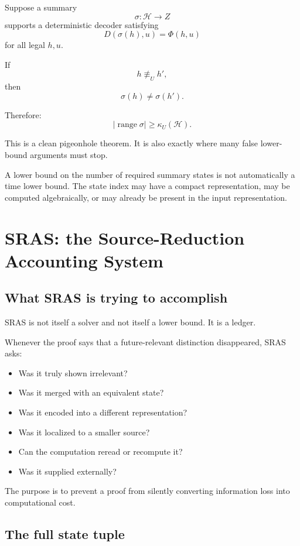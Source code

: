 \documentclass[11pt]{article}
\theoremstyle{plain}
\theoremstyle{definition}
\theoremstyle{remark}
\begin{document}
Suppose a summary
\[
\sigma:\mathcal H\to Z
\]
supports a deterministic decoder satisfying
\[
D(\sigma(h),u)=\Phi(h,u)
\]
for all legal \(h,u\).

If
\[
h\not\equiv_Uh',
\]
then
\[
\sigma(h)\ne\sigma(h').
\]

Therefore:
\[
\boxed{
|\operatorname{range}\sigma|
\ge
\kappa_U(\mathcal H).
}
\]

This is a clean pigeonhole theorem.  It is also exactly where many false
lower-bound arguments must stop.

\begin{warningbox}
A lower bound on the number of required summary states is not automatically a
time lower bound.  The state index may have a compact representation, may be
computed algebraically, or may already be present in the input representation.
\end{warningbox}

\section{SRAS: the Source-Reduction Accounting System}

\subsection{What SRAS is trying to accomplish}

SRAS is not itself a solver and not itself a lower bound.  It is a ledger.

Whenever the proof says that a future-relevant distinction disappeared, SRAS
asks:
\begin{itemize}[leftmargin=1.4em]
\item Was it truly shown irrelevant?
\item Was it merged with an equivalent state?
\item Was it encoded into a different representation?
\item Was it localized to a smaller source?
\item Can the computation reread or recompute it?
\item Was it supplied externally?
\end{itemize}

The purpose is to prevent a proof from silently converting information loss
into computational cost.

\subsection{The full state tuple}
\end{document}
